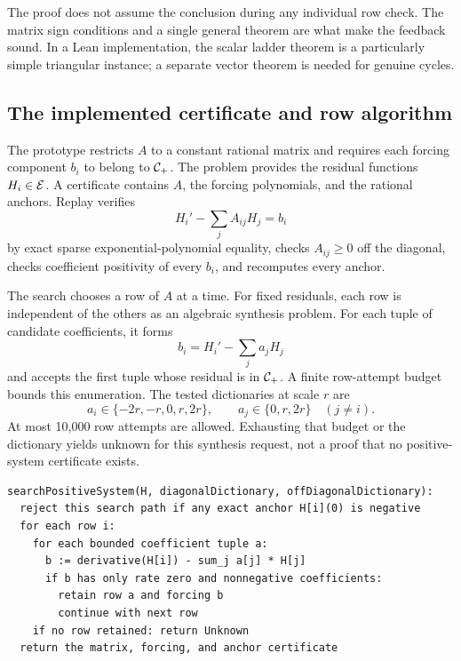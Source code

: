 The proof does not assume the conclusion during any individual row check. The matrix sign conditions and a single general theorem are what make the feedback sound. In a Lean implementation, the scalar ladder theorem is a particularly simple triangular instance; a separate vector theorem is needed for genuine cycles.

\subsection{The implemented certificate and row algorithm}

The prototype restricts $A$ to a constant rational matrix and requires each forcing component $b_i$ to belong to $\mathcal C_+$. The problem provides the residual functions $H_i\in\mathcal E$. A certificate contains $A$, the forcing polynomials, and the rational anchors. Replay verifies
\[
 H_i'-\sum_jA_{ij}H_j=b_i
\]
by exact sparse exponential-polynomial equality, checks $A_{ij}\ge0$ off the diagonal, checks coefficient positivity of every $b_i$, and recomputes every anchor.

The search chooses a row of $A$ at a time. For fixed residuals, each row is independent of the others as an algebraic synthesis problem. For each tuple of candidate coefficients, it forms
\[
 b_i=H_i'-\sum_j a_jH_j
\]
and accepts the first tuple whose residual is in $\mathcal C_+$. A finite row-attempt budget bounds this enumeration. The tested dictionaries at scale $r$ are
\[
 a_i\in\{-2r,-r,0,r,2r\},\qquad
 a_j\in\{0,r,2r\}\quad(j\ne i).
\]
At most 10,000 row attempts are allowed. Exhausting that budget or the dictionary yields unknown for this synthesis request, not a proof that no positive-system certificate exists.

\par\noindent\begin{minipage}{\textwidth}
\begin{lstlisting}
searchPositiveSystem(H, diagonalDictionary, offDiagonalDictionary):
  reject this search path if any exact anchor H[i](0) is negative
  for each row i:
    for each bounded coefficient tuple a:
      b := derivative(H[i]) - sum_j a[j] * H[j]
      if b has only rate zero and nonnegative coefficients:
        retain row a and forcing b
        continue with next row
    if no row retained: return Unknown
  return the matrix, forcing, and anchor certificate
\end{lstlisting}
\end{minipage}\par

